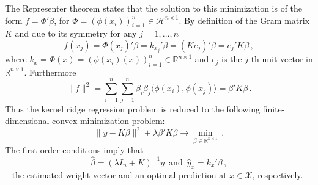 \documentclass[a4paper,14pt]{extarticle}
\newcommand{\Hcal}{\mathcal{H}}
\newcommand{\Xcal}{\mathcal{X}}
\newcommand{\Real}{\mathbb{R}}
\begin{document}
The Representer theorem states that the solution to this minimization is of the form
$f = \Phi'\beta$, for $\Phi = (\phi(x_i))_{i=1}^n \in \Hcal^{n\times 1}$. By definition
of the Gram matrix $K$ and due to its symmetry for any $j=1,\ldots,n$
\begin{equation*}
  f(x_j)
    = \Phi(x_j)' \beta
    = k_{x_j}' \beta
    = (K e_j)' \beta
    = e_j' K \beta
    \,,
\end{equation*}
where $k_x = \Phi(x) = (\phi(x_i)(x))_{i=1}^n \in \Real^{n\times 1}$ and $e_j$ is
the $j$-th unit vector in $\Real^{n\times 1}$. Furthermore
\begin{equation*}
  \| f \|^2
    = \sum_{i=1}^n\sum_{j=1}^n\beta_i\beta_j \langle\phi(x_i), \phi(x_j)\rangle
    = \beta' K \beta \,.
\end{equation*}
Thus the kernel ridge regression problem is reduced to the following finite-dimensional
convex minimization problem:
\begin{equation*}
  \|y - K \beta \|^2 + \lambda \beta' K \beta
    \to \min_{\beta\in \Real^{n\times 1}} \,.
\end{equation*}
The first order conditions imply that
\begin{equation} \label{eq:krr_approx}
  \hat{\beta} = (\lambda I_n + K)^{-1} y \,\text{ and }\, \hat{y}_x = k_x' \beta \,,
\end{equation}
-- the estimated weight vector and an optimal prediction at $x\in \Xcal$, respectively.
\end{document}
